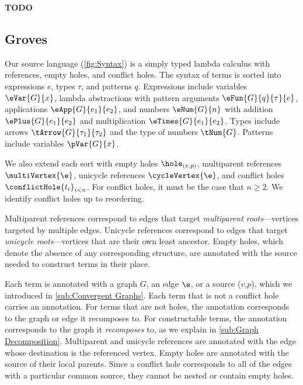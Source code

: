\textbf{TODO}

\subsection{Groves}%
\label{sub:Groves}

\figureTermSyntax


Our source language (\autoref{fig:Syntax}) is a simply typed lambda calculus with references, empty holes, and conflict holes.
The syntax of terms is sorted into
  expressions $e$,
  types $\tau$,
  and patterns $q$.
Expressions include
  variables $\eVar{G}{x}$,
  lambda abstractions with pattern arguments $\eFun{G}{q}{\tau}{e}$,
  applications $\eApp{G}{e_1}{e_2}$,
  and numbers $\eNum{G}{n}$ with addition $\ePlus{G}{e_1}{e_2}$ and multiplication $\eTimes{G}{e_1}{e_2}$.
Types include
  arrows $\tArrow{G}{\tau_1}{\tau_2}$
  and the type of numbers $\tNum{G}$.
Patterns include variables $\pVar{G}{x}$.

We also extend each sort with 
empty holes $\hole_{(v, p)}$,
multiparent references $\multiVertex{\e}$,
unicycle references $\cycleVertex{\e}$,
and conflict holes $\conflictHole{t_i}_{i < n}$.
For conflict holes, it must be the case that $n \geq 2$.
We identify conflict holes up to reordering.

Multiparent references correspond to edges that target
  \emph{multiparent roots}---vertices targeted by multiple edges.
Unicycle references correspond to edges that target
  \emph{unicycle roots}---vertices that are their own least ancestor.
  Empty holes, which denote the absence of any corresponding structure,
are annotated with the source needed to construct terms in their place.


Each term is annotated with a graph $G$, an edge $\e$, or a source ($v$,$p$), which we introduced in \autoref{sub:Convergent Graphs}. Each term that is not a conflict hole carries an annotation.
For terms that are not holes, the annotation corresponds to the graph or edge it recomposes to. For constructable terms, the annotation corresponds to the graph it \emph{recomposes} to, as we explain in \autoref{sub:Graph Decomposition}. Multiparent and unicycle references are annotated with the edge whose destination is the referenced vertex. Empty holes are annotated with the source of their local parents. Since a conflict hole corresponds to all of the edges with a particular common source, they cannot be nested or contain empty holes.

